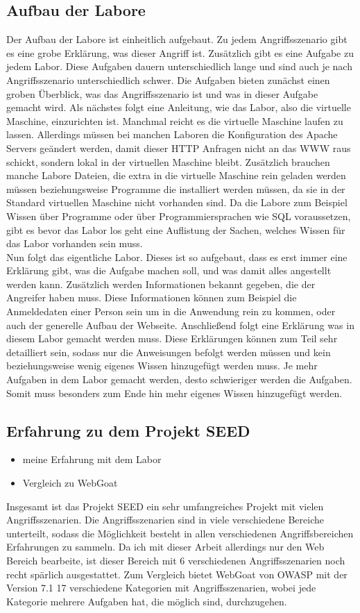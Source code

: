 \subsection{Aufbau der Labore}
Der Aufbau der Labore ist einheitlich aufgebaut. Zu jedem Angriffsszenario gibt es eine grobe Erklärung, was dieser Angriff ist. Zusätzlich gibt es eine Aufgabe zu jedem Labor. Diese Aufgaben dauern unterschiedlich lange und sind auch je nach Angriffsszenario unterschiedlich schwer. Die Aufgaben bieten zunächst einen groben Überblick, was das Angriffsszenario ist und was in dieser Aufgabe gemacht wird. Als nächstes folgt eine Anleitung, wie das Labor, also die virtuelle Maschine, einzurichten ist. Manchmal reicht es die virtuelle Maschine laufen zu lassen. Allerdings müssen bei manchen Laboren die Konfiguration des Apache Servers geändert werden, damit dieser HTTP Anfragen nicht an das WWW raus schickt, sondern lokal in der virtuellen Maschine bleibt. Zusätzlich brauchen manche Labore Dateien, die extra in die virtuelle Maschine rein geladen werden müssen beziehungsweise Programme die installiert werden müssen, da sie in der Standard virtuellen Maschine nicht vorhanden sind. Da die Labore zum Beispiel Wissen über Programme oder über Programmiersprachen wie SQL voraussetzen, gibt es bevor das Labor los geht eine Auflistung der Sachen, welches Wissen für das Labor vorhanden sein muss. \\
Nun folgt das eigentliche Labor. Dieses ist so aufgebaut, dass es erst immer eine Erklärung gibt, was die Aufgabe machen soll, und was damit alles angestellt werden kann. Zusätzlich werden Informationen bekannt gegeben, die der Angreifer haben muss. Diese Informationen können zum Beispiel die Anmeldedaten einer Person sein um in die Anwendung rein zu kommen, oder auch der generelle Aufbau der Webseite. Anschließend folgt eine Erklärung was in diesem Labor gemacht werden muss. Diese Erklärungen können zum Teil sehr detailliert sein, sodass nur die Anweisungen befolgt werden müssen und kein beziehungsweise wenig eigenes Wissen hinzugefügt werden muss. Je mehr Aufgaben in dem Labor gemacht werden, desto schwieriger werden die Aufgaben. Somit muss besonders zum Ende hin mehr eigenes Wissen hinzugefügt werden. 
\subsection{Erfahrung zu dem Projekt SEED}
\begin{itemize}
	\item meine Erfahrung mit dem Labor
	\item Vergleich zu WebGoat
\end{itemize}
Insgesamt ist das Projekt SEED ein sehr umfangreiches Projekt mit vielen Angriffsszenarien. Die Angriffsszenarien sind in viele verschiedene Bereiche unterteilt, sodass die Möglichkeit besteht in allen verschiedenen Angriffsbereichen Erfahrungen zu sammeln. Da ich mit dieser Arbeit allerdings nur den Web Bereich bearbeite, ist dieser Bereich mit 6 verschiedenen Angriffsszenarien noch recht spärlich ausgestattet. Zum Vergleich bietet WebGoat von OWASP mit der Version 7.1 17 verschiedene Kategorien mit Angriffsszenarien, wobei jede Kategorie mehrere Aufgaben hat, die möglich sind, durchzugehen. 
